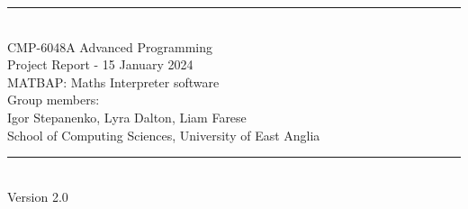 \documentclass[a4paper, oneside, 11pt]{report}
\begin{document}
\begin{titlepage}
\begin{center}
\rule{12cm}{1mm} \\
\vspace{1cm}
{\large  CMP-6048A Advanced Programming}
\vspace{7.5cm}
\\{\Large Project Report - 15 January 2024}
\vspace{1.5cm}
\\{\LARGE MATBAP: Maths Interpreter software}
\vspace{1.0cm}
\\{\Large Group members: \\ Igor Stepanenko, Lyra Dalton, Liam Farese\ }
\vspace{10.0cm}
\\{\large School of Computing Sciences, University of East Anglia}
\\ \rule{12cm}{0.5mm}
\\ \hspace{8.5cm} {\large Version 2.0}
\end{center}
\end{titlepage}


\setcounter{page}{1}
\end{document}
